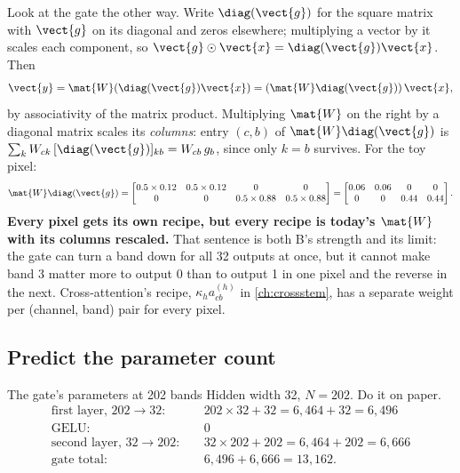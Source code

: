 Look at the gate the other way. Write $\diag(\vect{g})$ for the square matrix with $\vect{g}$ on its diagonal and zeros elsewhere; multiplying a vector by it scales each component, so $\vect{g}\odot\vect{x} = \diag(\vect{g})\vect{x}$. Then
\begin{align*}
  \vect{y} = \mat{W}(\diag(\vect{g})\vect{x}) = (\mat{W}\diag(\vect{g}))\,\vect{x},
\end{align*}
by associativity of the matrix product. Multiplying $\mat{W}$ on the right by a diagonal matrix scales its \emph{columns}: entry $(c, b)$ of $\mat{W}\diag(\vect{g})$ is $\sum_k W_{ck}\,[\diag(\vect{g})]_{kb} = W_{cb}\,g_b$, since only $k = b$ survives. For the toy pixel:
\begin{align*}
  \mat{W}\diag(\vect{g}) = \begin{bmatrix}0.5\times0.12 & 0.5\times0.12 & 0 & 0\\ 0 & 0 & 0.5\times0.88 & 0.5\times0.88\end{bmatrix}
  = \begin{bmatrix}0.06 & 0.06 & 0 & 0\\ 0 & 0 & 0.44 & 0.44\end{bmatrix}.
\end{align*}
\textbf{Every pixel gets its own recipe, but every recipe is today's $\mat{W}$ with its columns rescaled.} That sentence is both B's strength and its limit: the gate can turn a band down for all 32 outputs at once, but it cannot make band 3 matter more to output 0 than to output 1 in one pixel and the reverse in the next. Cross-attention's recipe, $\kappa_h a^{(h)}_{cb}$ in \cref{ch:crossstem}, has a separate weight per (channel, band) pair for every pixel.


\subsection{Predict the parameter count}

\begin{worked}[label={we:specdecoder:gateparams}]{The gate's parameters at 202 bands}
Hidden width 32, $N = 202$. Do it on paper.
\begin{align*}
  \text{first layer, }202\to32:&\quad 202\times32 + 32 = 6{,}464 + 32 = 6{,}496\\
  \text{GELU}:&\quad 0\\
  \text{second layer, }32\to202:&\quad 32\times202 + 202 = 6{,}464 + 202 = 6{,}666\\
  \text{gate total}:&\quad 6{,}496 + 6{,}666 = 13{,}162 .
\end{align*}
\end{worked}

